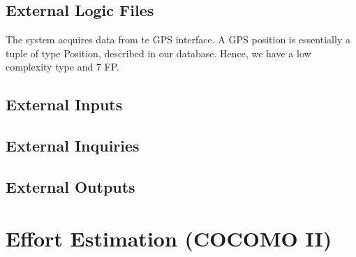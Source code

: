 \documentclass[\mainpath/main]{subfiles}
\begin{document}
\subsection{External Logic Files}
The system acquires data from te GPS interface. A GPS position is essentially a tuple of type Position, described in our database. Hence, we have a low complexity type and 7 FP.

\subsection{External Inputs}

\subsection{External Inquiries}

\subsection{External Outputs}


\section{Effort Estimation (COCOMO II)}
\label{ProjectEstimation:EffortEstimation}
\end{document}
